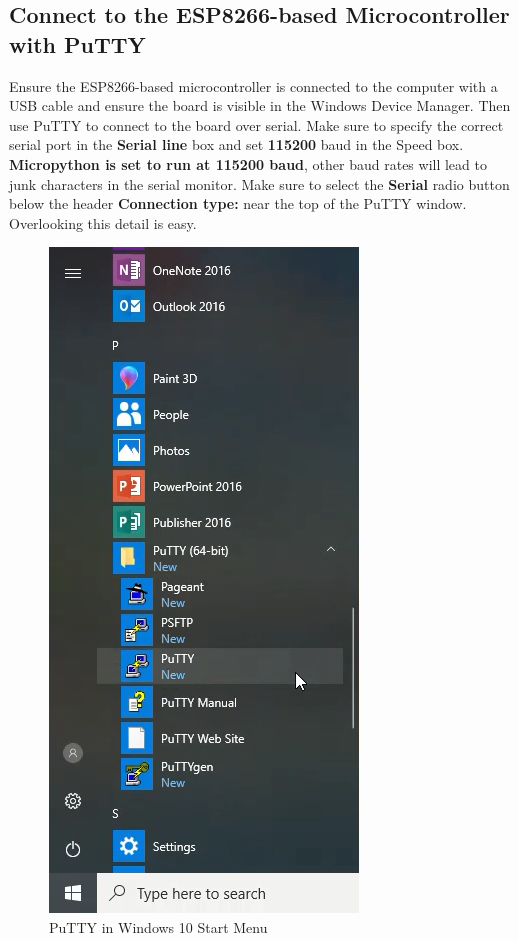 \documentclass{book}
\makeatletter
\def\maxwidth{\ifdim\Gin@nat@width>\linewidth\linewidth
    \else\Gin@nat@width\fi}
\let\Oldincludegraphics\includegraphics
\renewcommand{\includegraphics}[1]{\Oldincludegraphics[width=.8\maxwidth]{#1}}
\makeatother
\begin{document}
    
        \subsection{Connect to the ESP8266-based Microcontroller with
PuTTY}\label{connect-to-the-esp8266-based-microcontroller-with-putty}
    




    
        Ensure the ESP8266-based microcontroller is connected to the computer
with a USB cable and ensure the board is visible in the Windows Device
Manager. Then use PuTTY to connect to the board over serial. Make sure
to specify the correct serial port in the \textbf{Serial line} box and
set \textbf{115200} baud in the Speed box. \textbf{Micropython is set to
run at 115200 baud}, other baud rates will lead to junk characters in
the serial monitor. Make sure to select the \textbf{Serial} radio button
below the header \textbf{Connection type:} near the top of the PuTTY
window. Overlooking this detail is easy.

\begin{figure}
\centering
\includegraphics{images/putty_in_start_menu.png}
\caption{PuTTY in Windows 10 Start Menu}
\end{figure}
\end{document}
